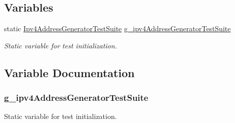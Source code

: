 \subsection*{Variables}
\begin{DoxyCompactItemize}
\item 
static \hyperlink{classIpv4AddressGeneratorTestSuite}{Ipv4\+Address\+Generator\+Test\+Suite} \hyperlink{ipv4-address-generator-test-suite_8cc_a10f79a2920d56fa8423fa760886691d4}{g\+\_\+ipv4\+Address\+Generator\+Test\+Suite}
\begin{DoxyCompactList}\small\item\em Static variable for test initialization. \end{DoxyCompactList}\end{DoxyCompactItemize}


\subsection{Variable Documentation}
\subsubsection[{\texorpdfstring{g\+\_\+ipv4\+Address\+Generator\+Test\+Suite}{g_ipv4AddressGeneratorTestSuite}}]{ g\+\_\+ipv4\+Address\+Generator\+Test\+Suite\hspace{0.3cm}{\ttfamily [static]}}\hypertarget{ipv4-address-generator-test-suite_8cc_a10f79a2920d56fa8423fa760886691d4}{}\label{ipv4-address-generator-test-suite_8cc_a10f79a2920d56fa8423fa760886691d4}


Static variable for test initialization. 

